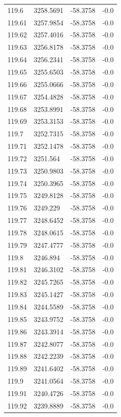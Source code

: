 \begin{table}[H]
\begin{tabular}{llll}
119.6 & 3258.5691 & -58.3758 & -0.0 \\
119.61 & 3257.9854 & -58.3758 & -0.0 \\
119.62 & 3257.4016 & -58.3758 & -0.0 \\
119.63 & 3256.8178 & -58.3758 & -0.0 \\
119.64 & 3256.2341 & -58.3758 & -0.0 \\
119.65 & 3255.6503 & -58.3758 & -0.0 \\
119.66 & 3255.0666 & -58.3758 & -0.0 \\
119.67 & 3254.4828 & -58.3758 & -0.0 \\
119.68 & 3253.8991 & -58.3758 & -0.0 \\
119.69 & 3253.3153 & -58.3758 & -0.0 \\
119.7 & 3252.7315 & -58.3758 & -0.0 \\
119.71 & 3252.1478 & -58.3758 & -0.0 \\
119.72 & 3251.564 & -58.3758 & -0.0 \\
119.73 & 3250.9803 & -58.3758 & -0.0 \\
119.74 & 3250.3965 & -58.3758 & -0.0 \\
119.75 & 3249.8128 & -58.3758 & -0.0 \\
119.76 & 3249.229 & -58.3758 & -0.0 \\
119.77 & 3248.6452 & -58.3758 & -0.0 \\
119.78 & 3248.0615 & -58.3758 & -0.0 \\
119.79 & 3247.4777 & -58.3758 & -0.0 \\
119.8 & 3246.894 & -58.3758 & -0.0 \\
119.81 & 3246.3102 & -58.3758 & -0.0 \\
119.82 & 3245.7265 & -58.3758 & -0.0 \\
119.83 & 3245.1427 & -58.3758 & -0.0 \\
119.84 & 3244.5589 & -58.3758 & -0.0 \\
119.85 & 3243.9752 & -58.3758 & -0.0 \\
119.86 & 3243.3914 & -58.3758 & -0.0 \\
119.87 & 3242.8077 & -58.3758 & -0.0 \\
119.88 & 3242.2239 & -58.3758 & -0.0 \\
119.89 & 3241.6402 & -58.3758 & -0.0 \\
119.9 & 3241.0564 & -58.3758 & -0.0 \\
119.91 & 3240.4726 & -58.3758 & -0.0 \\
119.92 & 3239.8889 & -58.3758 & -0.0 \\

\end{tabular}
\end{table}

